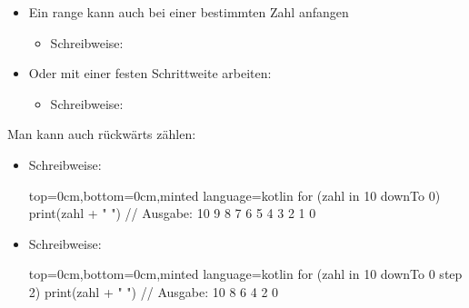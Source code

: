 

\begin{frame}
    \slidehead

    \begin{itemize}
        \item Ein range kann auch bei einer bestimmten Zahl anfangen
            \begin{itemize}
                \item Schreibweise: 
            \end{itemize}
        \item Oder mit einer festen Schrittweite arbeiten:
            \begin{itemize}
                \item Schreibweise: 
            \end{itemize}
    \end{itemize}
\end{frame}

\begin{frame}[fragile]
    \slidehead

    Man kann auch rückwärts zählen:
    \begin{itemize}
        \item Schreibweise: 
            \begin{codeBlock}[]{top=0cm,bottom=0cm,minted language=kotlin}
            for (zahl in 10 downTo 0) {
                print(zahl + " ")
            }
            // Ausgabe: 10 9 8 7 6 5 4 3 2 1 0
        \end{codeBlock}
        \item Schreibweise: 
            \begin{codeBlock}[]{top=0cm,bottom=0cm,minted language=kotlin}
            for (zahl in 10 downTo 0 step 2) {
                print(zahl + " ")
            }
            // Ausgabe: 10 8 6 4 2 0
        \end{codeBlock}
    \end{itemize}
\end{frame}

